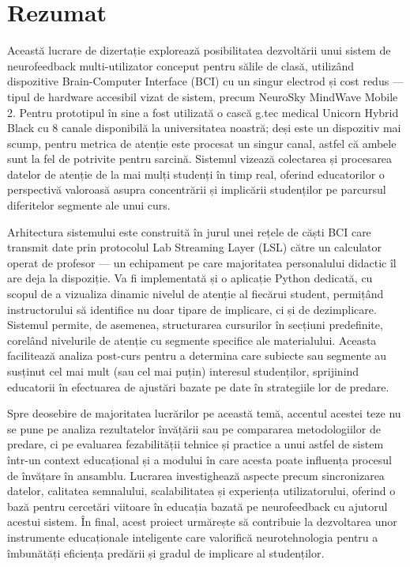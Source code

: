 \newpage
\section*{Rezumat}

Această lucrare de dizertație explorează posibilitatea dezvoltării unui sistem de neurofeedback multi-utilizator conceput pentru sălile de clasă, utilizând dispozitive Brain-Computer Interface (BCI) cu un singur electrod și cost redus --- tipul de hardware accesibil vizat de sistem, precum NeuroSky MindWave Mobile 2. Pentru prototipul în sine a fost utilizată o cască g.tec medical Unicorn Hybrid Black cu 8 canale disponibilă la universitatea noastră; deși este un dispozitiv mai scump, pentru metrica de atenție este procesat un singur canal, astfel că ambele sunt la fel de potrivite pentru sarcină. Sistemul vizează colectarea și procesarea datelor de atenție de la mai mulți studenți în timp real, oferind educatorilor o perspectivă valoroasă asupra concentrării și implicării studenților pe parcursul diferitelor segmente ale unui curs.

Arhitectura sistemului este construită în jurul unei rețele de căști BCI care transmit date prin protocolul Lab Streaming Layer (LSL) către un calculator operat de profesor --- un echipament pe care majoritatea personalului didactic îl are deja la dispoziție. Va fi implementată și o aplicație Python dedicată, cu scopul de a vizualiza dinamic nivelul de atenție al fiecărui student, permițând instructorului să identifice nu doar tipare de implicare, ci și de dezimplicare. Sistemul permite, de asemenea, structurarea cursurilor în secțiuni predefinite, corelând nivelurile de atenție cu segmente specifice ale materialului. Aceasta facilitează analiza post-curs pentru a determina care subiecte sau segmente au susținut cel mai mult (sau cel mai puțin) interesul studenților, sprijinind educatorii în efectuarea de ajustări bazate pe date în strategiile lor de predare.

Spre deosebire de majoritatea lucrărilor pe această temă, accentul acestei teze nu se pune pe analiza rezultatelor învățării sau pe compararea metodologiilor de predare, ci pe evaluarea fezabilității tehnice și practice a unui astfel de sistem într-un context educațional și a modului în care acesta poate influența procesul de învățare în ansamblu. Lucrarea investighează aspecte precum sincronizarea datelor, calitatea semnalului, scalabilitatea și experiența utilizatorului, oferind o bază pentru cercetări viitoare în educația bazată pe neurofeedback cu ajutorul acestui sistem. În final, acest proiect urmărește să contribuie la dezvoltarea unor instrumente educaționale inteligente care valorifică neurotehnologia pentru a îmbunătăți eficiența predării și gradul de implicare al studenților.
